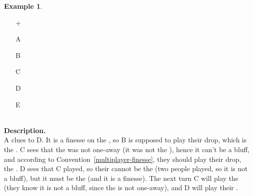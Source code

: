 \documentclass[a4paper]{article}
\theoremstyle{plain}
\theoremstyle{definition}
\newtheorem{example}[theorem]{Example}
\begin{document}
\begin{example}	\hfill \\
	\begin{minipage}{0.45\textwidth}
		\begin{itemize}
			\item[\Large +]      
			\item[\Large A]    
			\item[\Large B]    
			\item[\Large C]    
			\item[\Large D]    
			\item[\Large E]    
		\end{itemize}
	\end{minipage}%
	\begin{minipage}{0.55\textwidth}
		\hfill \\
		
		\textbf{Description.} \\
		
		A clues  to D. It is a finesse on the , so B is supposed to play their drop, which is the . C sees that the  was not one-away (it was not the ), hence it can't be a bluff, and according to Convention~\ref{multiplayer-finesse}, they should play their drop, the . D sees that C played, so their  cannot be the  (two people played, so it is not a bluff), but it must be the  (and it is a finesse). The next turn C will play the  (they know it is not a bluff, since the  is not one-away), and D will play their .
	\end{minipage}
\end{example} \vspace{0.15 cm}
\end{document}
